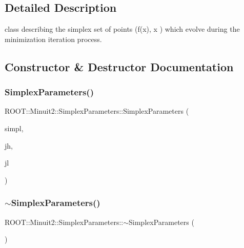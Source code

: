 \subsection{Detailed Description}
class describing the simplex set of points (f(x), x ) which evolve during the minimization iteration process. 

\subsection{Constructor \& Destructor Documentation}
\mbox{\label{classROOT_1_1Minuit2_1_1SimplexParameters_a65e9ef329f7c1be19f68e0a1b817c584}} 
\subsubsection{\texorpdfstring{SimplexParameters()}{SimplexParameters()}\hspace{0.1cm}{\footnotesize\ttfamily [1/2]}}
{\footnotesize\ttfamily R\+O\+O\+T\+::\+Minuit2\+::\+Simplex\+Parameters\+::\+Simplex\+Parameters (\begin{DoxyParamCaption}\item[{const std\+::vector$<$ std\+::pair$<$ double, \mbox{\hyperlink{namespaceROOT_1_1Minuit2_a62ed97730a1ca8d3fbaec64a19aa11c9}{Mn\+Algebraic\+Vector}} $>$ $>$ \&}]{simpl,  }\item[{unsigned int}]{jh,  }\item[{unsigned int}]{jl }\end{DoxyParamCaption})\hspace{0.3cm}{\ttfamily [inline]}}

\mbox{\label{classROOT_1_1Minuit2_1_1SimplexParameters_a13162b4c95b96890972dc24e7ba2e9a8}} 
\subsubsection{\texorpdfstring{$\sim$SimplexParameters()}{~SimplexParameters()}\hspace{0.1cm}{\footnotesize\ttfamily [1/2]}}
{\footnotesize\ttfamily R\+O\+O\+T\+::\+Minuit2\+::\+Simplex\+Parameters\+::$\sim$\+Simplex\+Parameters (\begin{DoxyParamCaption}{ }\end{DoxyParamCaption})\hspace{0.3cm}{\ttfamily [inline]}}


